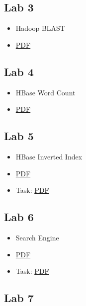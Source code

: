 \subsection{Lab 3}\label{lab-3}

\begin{itemize}
\item
  Hadoop BLAST
\item
  \href{https://drive.google.com/open?id=0B88HKpainTSfdUhVOWRyNnZBT0E}{PDF}
\end{itemize}

\subsection{Lab 4}\label{lab-4}

\begin{itemize}
\item
  HBase Word Count
\item
  \href{https://drive.google.com/open?id=0B88HKpainTSfZEE5N2JnN2ZMZGc}{PDF}
\end{itemize}

\subsection{Lab 5}\label{lab-5}

\begin{itemize}
\item
  HBase Inverted Index
\item
  \href{https://drive.google.com/open?id=0B88HKpainTSfM010TVZuTlJnSVE}{PDF}
\item
  Task:
  \href{https://drive.google.com/open?id=0B88HKpainTSfWjEySFdhcjFpZU0}{PDF}
\end{itemize}

\subsection{Lab 6}\label{lab-6}

\begin{itemize}
\item
  Search Engine
\item
  \href{https://drive.google.com/open?id=0B88HKpainTSfWXVuRGlCcFJZSUU}{PDF}
\item
  Task:
  \href{https://drive.google.com/open?id=0B88HKpainTSfLWN1V2Vib19DdTA}{PDF}
\end{itemize}

\subsection{Lab 7}\label{lab-7}

